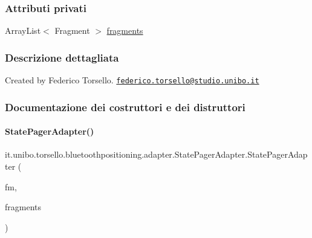 \subsubsection*{Attributi privati}
\begin{DoxyCompactItemize}
\item 
Array\+List$<$ Fragment $>$ \hyperlink{classit_1_1unibo_1_1torsello_1_1bluetoothpositioning_1_1adapter_1_1StatePagerAdapter_a6d30ff8266b65b268d46d03eb30da1db_a6d30ff8266b65b268d46d03eb30da1db}{fragments}
\end{DoxyCompactItemize}


\subsubsection{Descrizione dettagliata}
Created by Federico Torsello. \href{mailto:federico.torsello@studio.unibo.it}{\tt federico.\+torsello@studio.\+unibo.\+it} 

\subsubsection{Documentazione dei costruttori e dei distruttori}
\hypertarget{classit_1_1unibo_1_1torsello_1_1bluetoothpositioning_1_1adapter_1_1StatePagerAdapter_afd334cc5759e5d948cc53f04e3b595dc_afd334cc5759e5d948cc53f04e3b595dc}{}\label{classit_1_1unibo_1_1torsello_1_1bluetoothpositioning_1_1adapter_1_1StatePagerAdapter_afd334cc5759e5d948cc53f04e3b595dc_afd334cc5759e5d948cc53f04e3b595dc} 
\paragraph{\texorpdfstring{State\+Pager\+Adapter()}{StatePagerAdapter()}}
{\footnotesize\ttfamily it.\+unibo.\+torsello.\+bluetoothpositioning.\+adapter.\+State\+Pager\+Adapter.\+State\+Pager\+Adapter (\begin{DoxyParamCaption}\item[{Fragment\+Manager}]{fm,  }\item[{Array\+List$<$ Fragment $>$}]{fragments }\end{DoxyParamCaption})}


